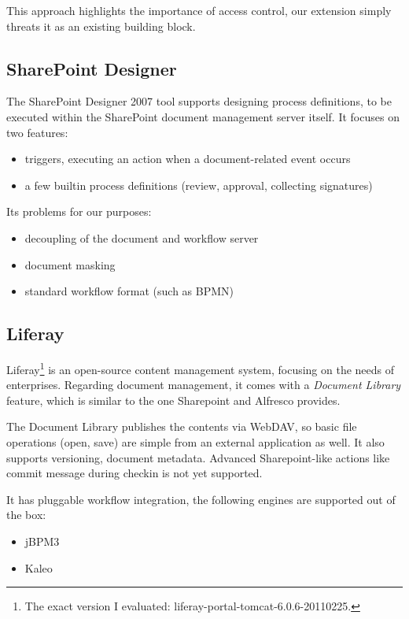 This approach highlights the importance of access control, our extension simply
threats it as an existing building block.

\subsection*{SharePoint Designer}

The SharePoint Designer 2007 tool \cite{sp-designer} supports designing process definitions, to
be executed within the SharePoint document management server itself. It focuses on two features:

\begin{itemize}
\item triggers, executing an action when a document-related event occurs
\item a few builtin process definitions (review, approval, collecting signatures)
\end{itemize}

Its problems for our purposes:

\begin{itemize}
\item decoupling of the document and workflow server
\item document masking
\item standard workflow format (such as BPMN)
\end{itemize}

\subsection*{Liferay}

Liferay\footnote{The exact version I evaluated:
liferay-portal-tomcat-6.0.6-20110225.} \cite{liferay} is an open-source content management
system, focusing on the needs of enterprises. Regarding document management, it
comes with a \emph{Document Library} feature, which is similar to the one
Sharepoint and Alfresco provides.

The Document Library publishes the contents via WebDAV, so basic file
operations (open, save) are simple from an external application as well. It
also supports versioning, document metadata. Advanced Sharepoint-like actions
like commit message during checkin is not yet supported.

It has pluggable workflow integration, the following engines are supported out of the box:

\begin{itemize}
\item jBPM3
\item Kaleo
\end{itemize}


